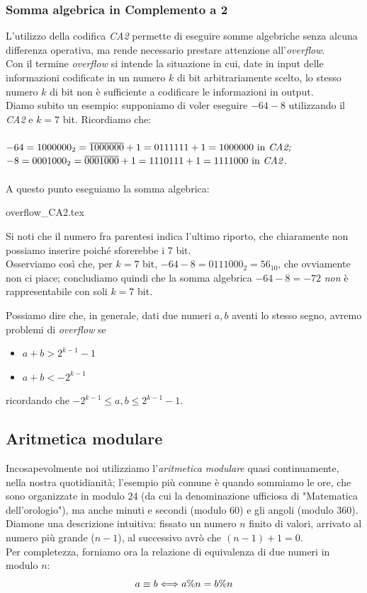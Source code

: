 \documentclass[class=book, crop=false, oneside]{standalone}
\begin{document}
\subsubsection{Somma algebrica in Complemento a 2} L'utilizzo della codifica \emph{CA2} permette di eseguire somme algebriche senza alcuna differenza operativa, ma rende necessario prestare attenzione all'\emph{overflow}.\\
Con il termine \emph{overflow} si intende la situazione in cui, date in input delle informazioni codificate in un numero $k$ di bit arbitrariamente scelto, lo stesso numero $k$ di bit non è sufficiente a codificare le informazioni in output. \\
Diamo subito un esempio: supponiamo di voler eseguire $-64-8$ utilizzando il \emph{CA2} e $k=7$ bit. Ricordiamo che:\\\\
$-64=1000000_{2}=\overline{1000000}+1=0111111+1=1000000 \text{ in \emph{CA2;}}$\\
$-8=0001000_{2}=\overline{0001000}+1=1110111+1=1111000 \text{ in \emph{CA2}}.$\\\\
A questo punto eseguiamo la somma algebrica:
\begin{table}[H]
	\centering
	{overflow_CA2.tex}
\end{table}
Si noti che il numero fra parentesi indica l'ultimo riporto, che chiaramente non possiamo inserire poiché sforerebbe i 7 bit.\\
Osserviamo così che, per $k=7$ bit, $-64-8=0111000_{2}=56_{10}$, che ovviamente non ci piace; concludiamo quindi che la somma algebrica $-64-8=-72$ \emph{non} è rappresentabile con soli $k=7$ bit.

Possiamo dire che, in generale, dati due numeri $a, b$ aventi lo stesso segno, avremo problemi di \emph{overflow} se
\begin{itemize}[noitemsep,nolistsep]
	\item $a+b>2^{k-1}-1$
	\item $a+b<-2^{k-1}$
\end{itemize}
ricordando che $-2^{k-1}\le a,b\le 2^{k-1}-1$.

\subsection{Aritmetica modulare} Incosapevolmente noi utilizziamo l'\emph{aritmetica modulare} quasi continuamente, nella nostra quotidianità; l'esempio più comune è quando sommiamo le ore, che sono organizzate in modulo 24 (da cui la denominazione ufficiosa di "Matematica dell'orologio"), ma anche minuti e secondi (modulo 60) e gli angoli (modulo 360).\\
Diamone una descrizione intuitiva: fissato un numero $n$ finito di valori, arrivato al numero più grande ($n-1$), al successivo avrò che $(n-1)+1=0$.\\
Per completezza, forniamo ora la relazione di equivalenza di due numeri in modulo $n$:
\begin{equation*}
\centering
a\equiv b \Longleftrightarrow a\%n=b\%n
\end{equation*}
\end{document}
